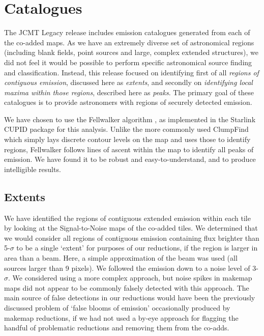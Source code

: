 \documentclass[twocolumn,times]{aastex6}
\begin{document}
\section{Catalogues}
\label{sec:cat}
The JCMT Legacy release includes emission catalogues generated from
each of the co-added maps. As we have an extremely diverse set of
astronomical regions (including blank fields, point sources and large,
complex extended structures), we did not feel it would be possible to
perform specific astronomical source finding and
classification. Instead, this release focused on identifying first of
all \emph{regions of contiguous emission}, discussed here as
\emph{extents}, and secondly on \emph{identifying local maxima within
  those regions}, described here as \emph{peaks}. The primary goal of
these catalogues is to provide astronomers with regions of securely
detected emission.


We have chosen to use the Fellwalker algorithm \citep{Berry2015}, as
implemented in the Starlink CUPID \citep{cupid} package for this
analysis. Unlike the more commonly used ClumpFind which simply lays
discrete contour levels on the map and uses those to identify regions,
Fellwalker follows lines of ascent within the map to identify all
peaks of emission. We have found it to be robust and
easy-to-understand, and to produce intelligible results.

\subsection{Extents}
\label{sec:extents}
We have identified the regions of contiguous extended emission within
each tile by looking at the Signal-to-Noise maps of the co-added
tiles. We determined that we would consider all regions of contiguous
emission containing flux brighter than 5-$\sigma$ to be a single `extent'
for purposes of our reductions, if the region is larger in area than a
beam.  Here, a simple approximation of the beam was used (all sources
larger than 9 pixels). We followed the emission down to a noise level
of 3-$\sigma$. We considered using a more complex approach, but noise
spikes in makemap maps did not appear to be commonly falsely detected
with this approach. The main source of false detections in our
reductions would have been the previously discussed problem of `false
blooms of emission' occasionally produced by makemap reductions, if we
had not used a by-eye approach for flagging the handful of problematic
reductions and removing them from the co-adds.
\end{document}
